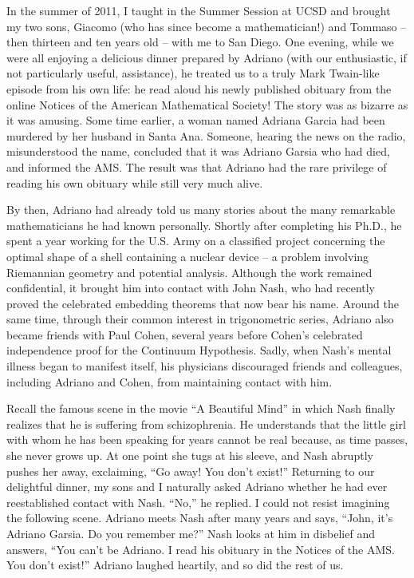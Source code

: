 \documentclass{amsart}
\begin{document}
In the summer of 2011, I taught in the Summer Session at UCSD and brought my two sons,
Giacomo (who has since become a mathematician!) and Tommaso -- then thirteen and ten years old --
with me to San Diego. One evening, while we were all enjoying a delicious dinner prepared by
Adriano
(with our enthusiastic, if not particularly useful, assistance), he treated us to a truly Mark Twain-like
episode from his own life: he read aloud his newly published obituary from the online Notices of the
American Mathematical Society! The story was as bizarre as it was amusing. Some time earlier, a
woman named Adriana Garcia had been murdered by her husband in Santa Ana. Someone, hearing
the news on the radio, misunderstood the name, concluded that it was Adriano Garsia who had died,
and informed the AMS. The result was that Adriano had the rare privilege of reading his own obituary
while still very much alive.

By then, Adriano had already told us many stories about the many remarkable mathematicians he had
known personally. Shortly after completing his Ph.D., he spent a year working for the U.S. Army on a
classified project concerning the optimal shape of a shell containing a nuclear device -- a problem
involving Riemannian geometry and potential analysis. Although the work remained confidential, it
brought him into contact with John Nash, who had recently proved the celebrated embedding
theorems that now bear his name. Around the same time, through their common interest in
trigonometric series, Adriano also became friends with Paul Cohen, several years before Cohen's
celebrated independence proof for the Continuum Hypothesis. Sadly, when Nash's mental illness
began to manifest itself, his physicians discouraged friends and colleagues, including Adriano and
Cohen, from maintaining contact with him.

Recall the famous scene in the movie ``A Beautiful Mind'' in which Nash finally realizes that he is
suffering from schizophrenia. He understands that the little girl with whom he has been speaking for
years cannot be real because, as time passes, she never grows up. At one point she tugs at his sleeve,
and Nash abruptly pushes her away, exclaiming,
``Go away! You don't exist!''
Returning to our delightful dinner, my sons and I naturally asked Adriano whether he had ever
reestablished contact with Nash.
``No,'' he replied. I could not resist imagining the following scene.
Adriano meets Nash after many years and says,
``John, it's Adriano Garsia. Do you remember me?''
Nash looks at him in disbelief and answers,
``You can't be Adriano. I read his obituary in the Notices of
the AMS. You don't exist!'' Adriano laughed heartily, and so did the rest of us.
\end{document}
